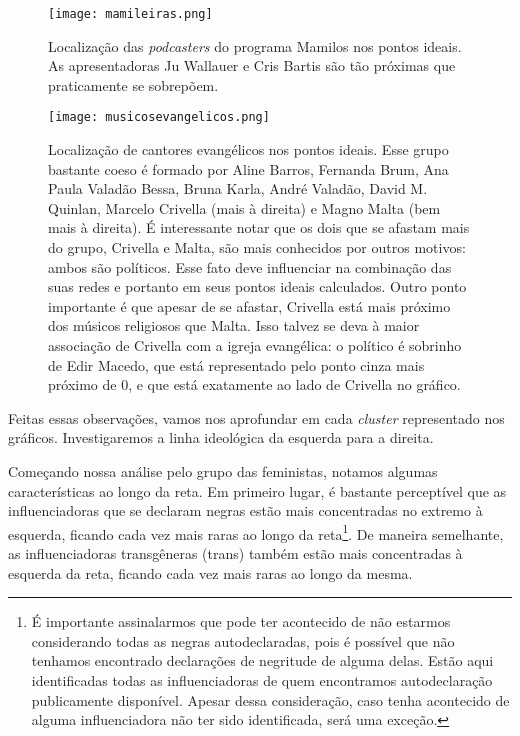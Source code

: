 \documentclass[
	12pt,				%
	openright,			%
	twoside,			%
	a4paper,			%
	english,			%
	brazil				%
	]{abntex2}
\begin{document}
 \begin{figure}[!htbp]
    \centering
    \texttt{[image: mamileiras.png]}
    \caption{Localização das \textit{podcasters} do programa Mamilos nos pontos ideais. As apresentadoras Ju Wallauer e Cris Bartis são tão próximas que praticamente se sobrepõem.}
    \label{mamileiras}
 \end{figure}

 \begin{figure}[!htbp]
    \centering
    \texttt{[image: musicosevangelicos.png]}
    \caption{Localização de cantores evangélicos nos pontos ideais. Esse grupo bastante coeso é formado por Aline Barros, Fernanda Brum, Ana Paula Valadão Bessa, Bruna Karla, André Valadão, David M. Quinlan, Marcelo Crivella (mais à direita) e Magno Malta (bem mais à direita). É interessante notar que os dois que se afastam mais do grupo, Crivella e Malta, são mais conhecidos por outros motivos: ambos são políticos. Esse fato deve influenciar na combinação das suas redes e portanto em seus pontos ideais calculados. Outro ponto importante é que apesar de se afastar, Crivella está mais próximo dos músicos religiosos que Malta. Isso talvez se deva à maior associação de Crivella com a igreja evangélica: o político é sobrinho de Edir Macedo, que está representado pelo ponto cinza mais próximo de 0, e que está exatamente ao lado de Crivella no gráfico.}
    \label{musicosevangelicos}
 \end{figure}
 
 Feitas essas observações, vamos nos aprofundar em cada \textit{cluster} representado nos gráficos. Investigaremos a linha ideológica da esquerda para a direita.
 
 Começando nossa análise pelo grupo das feministas, notamos algumas características ao longo da reta. Em primeiro lugar, é bastante perceptível que as influenciadoras que se declaram negras estão mais concentradas no extremo à esquerda, ficando cada vez mais raras ao longo da reta\footnote{É importante assinalarmos que pode ter acontecido de não estarmos considerando todas as negras autodeclaradas, pois é possível que não tenhamos encontrado declarações de negritude de alguma delas. Estão aqui identificadas todas as influenciadoras de quem encontramos autodeclaração publicamente disponível. Apesar dessa consideração, caso tenha acontecido de alguma influenciadora não ter sido identificada, será uma exceção.}. De maneira semelhante, as influenciadoras transgêneras (trans) também estão mais concentradas à esquerda da reta, ficando cada vez mais raras ao longo da mesma.
\end{document}
